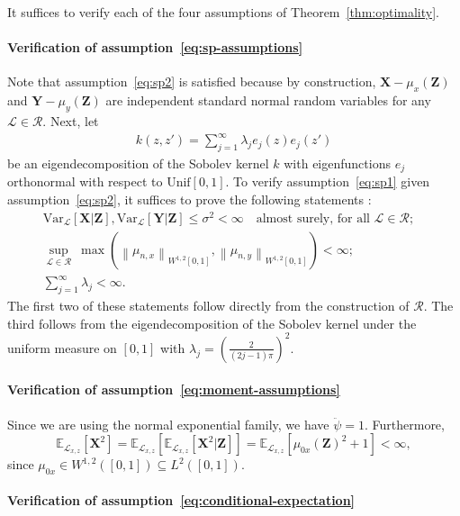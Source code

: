 \documentclass[aos]{imsart}
\theoremstyle{definition}
\theoremstyle{remark}
\newcommand{\E}{\mathbb E}								%
\newcommand{\V}{\mathrm{Var}}							%
\newcommand{\norm}[1]{\left\lVert{#1}\right\rVert}		%
\newcommand{\prx}{\bm X}								%
\newcommand{\prz}{\bm Z}								%
\newcommand{\pry}{{\bm Y}}								%
\newcommand{\law}{\mathcal L}							%
\newcommand{\regclass}{\mathscr R}					    %
\begin{document}
It suffices to verify each of the four assumptions of Theorem~\ref{thm:optimality}.

\paragraph*{Verification of assumption~\eqref{eq:sp-assumptions}}

Note that assumption~\eqref{eq:sp2} is satisfied because by construction, $\prx - \mu_{x}(\prz)$ and $\pry - \mu_y(\prz)$ are independent standard normal random variables for any $\law \in \regclass$. Next, let 
\begin{align}\label{eq:eigen_decomp}
	k(z,z')=\sum_{j=1}^{\infty}\lambda_{j}e_{j}(z)e_{j}(z')
\end{align}
be an eigendecomposition of the Sobolev kernel $k$ with eigenfunctions $e_{j}$ orthonormal with respect to $\text{Unif}[0,1]$. To verify assumption~\eqref{eq:sp1} given assumption~\eqref{eq:sp2}, it suffices to prove the following statements \citep[Theorem 11 and Remark 12]{Shah2018}: 
\begin{align*}
\V_{\law}[\prx|\prz], \V_{\law}[\pry|\prz] \leq \sigma^2 < \infty \quad \text{almost surely, for all } \law \in \regclass;& \\
\sup_{\law \in \regclass}\ \max(\norm{\mu_{n,x}}_{W^{1,2}[0,1]}, \norm{\mu_{n,y}}_{W^{1,2}[0,1]}) < \infty;& \\
\sum_{j = 1}^\infty \lambda_{j} < \infty.&
\end{align*}
The first two of these statements follow directly from the construction of $\regclass$. The third follows from the eigendecomposition of the Sobolev kernel under the uniform measure on $[0,1]$ \citep[Example 12.23]{Wainwright2019} with $\lambda_j = (\frac{2}{(2j-1)\pi})^2$.

\paragraph*{Verification of assumption~\eqref{eq:moment-assumptions}}

Since we are using the normal exponential family, we have $\ddot \psi = 1$. Furthermore, 
\begin{equation}
\E_{\law_{x,z}}[\prx^2] = \E_{\law_{x,z}}[\E_{\law_{x,z}}[\prx^2|\prz]] = \E_{\law_{x,z}}[\mu_{0x}(\prz)^2 + 1] < \infty,
\end{equation}
since $\mu_{0x} \in W^{1,2}([0,1]) \subseteq L^2([0,1])$.

\paragraph*{Verification of assumption~\eqref{eq:conditional-expectation}}
\end{document}
